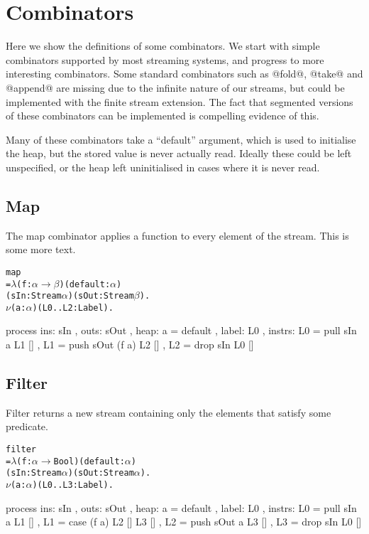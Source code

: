 \clearpage{}

\section{Combinators}
\label{s:Combinators}
Here we show the definitions of some combinators. We start with simple combinators supported by most streaming systems, and progress to more interesting combinators. Some standard combinators such as @fold@, @take@ and @append@ are missing due to the infinite nature of our streams, but could be implemented with the finite stream extension. The fact that segmented versions of these combinators can be implemented is compelling evidence of this.

Many of these combinators take a ``default'' argument, which is used to initialise the heap, but the stored value is never actually read. Ideally these could be left unspecified, or the heap left uninitialised in cases where it is never read.

\subsection{Map}
The map combinator applies a function to every element of the stream. This is some more text.

\begin{alltt}
map 
 =  \(\lambda\) (f : \(\alpha \to \beta\)) (default : \(\alpha\))
      (sIn: Stream \(\alpha\)) (sOut: Stream \(\beta\)). 
    \(\nu\) (a: \(\alpha\)) (L0..L2: Label).
\end{alltt}
\begin{code}
    process
    { ins:    { sIn }
    , outs:   { sOut }
    , heap:   { a = default }
    , label:  L0
    , instrs: { L0 = pull sIn     a  L1 []
              , L1 = push sOut (f a) L2 []
              , L2 = drop sIn        L0 [] } }
\end{code}


\subsection{Filter}
Filter returns a new stream containing only the elements that satisfy some predicate.
\begin{alltt}
filter 
 =  \(\lambda\) (f : \(\alpha \to\) Bool) (default : \(\alpha\))
      (sIn: Stream \(\alpha\)) (sOut: Stream \(\alpha\)). 
    \(\nu\) (a: \(\alpha\)) (L0..L3: Label).
\end{alltt}
\begin{code}
    process
    { ins:    { sIn }
    , outs:   { sOut }
    , heap:   { a = default }
    , label:  L0
    , instrs: { L0 = pull sIn  a     L1 []
              , L1 = case   (f a)    L2 []  L3 []
              , L2 = push sOut a     L3 []
              , L3 = drop sIn        L0 [] } }
\end{code}


